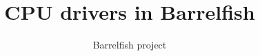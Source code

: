 \documentclass[a4paper,11pt,twoside]{report}
\title{CPU drivers in Barrelfish}
\author{Barrelfish project}
\begin{document}
\maketitle			%

\begin{versionhistory}
\end{versionhistory}

\tableofcontents		%
\cleardoublepage
\setcounter{secnumdepth}{2}

\newcommand{\fnname}[1]{\textit{\texttt{#1}}}%
\newcommand{\datatype}[1]{\textit{\texttt{#1}}}%
\newcommand{\varname}[1]{\texttt{#1}}%
\newcommand{\keywname}[1]{\textbf{\texttt{#1}}}%
\newcommand{\pathname}[1]{\texttt{#1}}%
\newcommand{\tabindent}{\hspace*{3ex}}%
\end{document}

